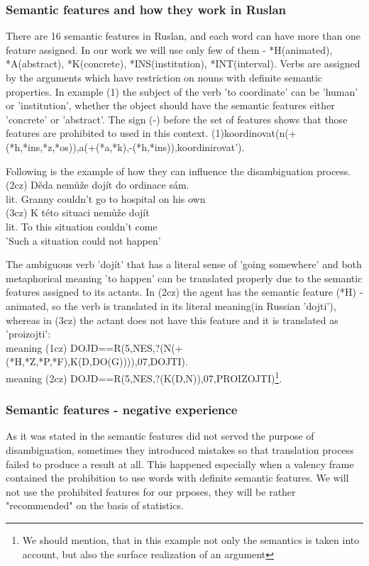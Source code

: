 \documentclass[letterpaper]{article}
\begin{document}
\begin{itemize}
\subsubsection{Semantic features and how they work in Ruslan}
There are 16 semantic features in Ruslan, and each word can have more than one
feature assigned. In our work we will use only few of them - *H(animated), *A(abstract),
*K(concrete), *INS(institution), *INT(interval). Verbs are assigned by the arguments
which have restriction on nouns with definite semantic properties. In example (1)
the subject of the verb 'to coordinate' can be 'human' or 'institution', whether
the object should have the semantic features either 'concrete' or 'abstract'. The sign (-)
before the set of features shows that those features are prohibited to used in this context.
(1)koordinovat(n(+(*h,*ins,*z,*os)),a(+(*a,*k),-(*h,*ins)),koordinirovat').

Following is the example of how they can influence the disambiguation process.\\
(2cz) Děda nemůže dojít do ordinace sám.\\
lit. Granny couldn't go to hospital on his own\\
(3cz) K této situaci nemůže dojít\\
lit. To this situation couldn't come\\
'Such a situation could not happen'

The ambiguous verb 'dojít' that has a literal sense of 'going somewhere'
and both metaphorical meaning 'to happen' can be translated properly
due to the semantic features assigned to its actants. In (2cz) the
agent has the semantic feature (*H) - animated, so the verb is translated
in its literal meaning(in Russian 'dojti'), whereas in (3cz) the actant does not have this feature
and it is translated as 'proizojti':\\
meaning (1cz) DOJD==R(5,NES,?(N(+(*H,*Z,*P,*F),K(D,DO(G)))),07,DOJTI).\\
meaning (2cz) DOJD==R(5,NES,?(K(D,N)),07,PROIZOJTI)\footnote{We should mention, that in this example
not only the semantics is taken into account, but also the surface realization of an argument}.\\


\subsubsection{Semantic features - negative experience}
As it was stated in \cite{KubonPHD2001} the semantic features did not
served the purpose of disambiguation, sometimes they introduced mistakes
so that translation process failed to produce a result at all. This
happened especially when a valency frame contained the prohibition
to use words with definite semantic features.
We will not use the prohibited features for our prposes, they will be rather "recommended" on the basis of
statistics.



\end{itemize}
\end{document}
